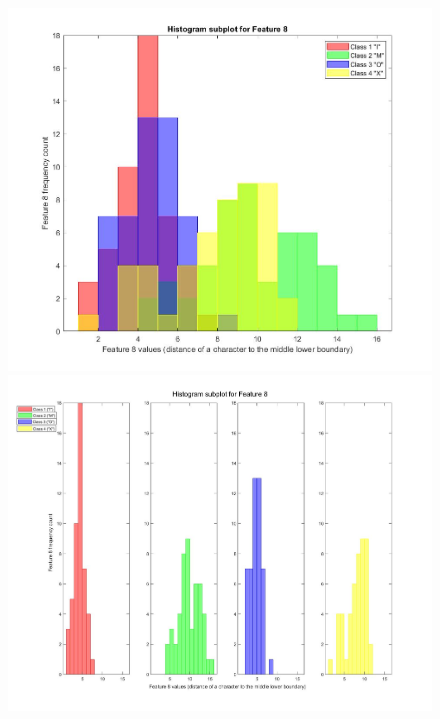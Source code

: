 \documentclass[a4paper,12pt]{article}
\begin{document}
\begin{figure}[H]
\centering
\includegraphics[scale=0.3]{q1pc_8.jpg}
\includegraphics[scale=0.3]{q1pcs_8.jpg}
\end{figure}
\end{document}
